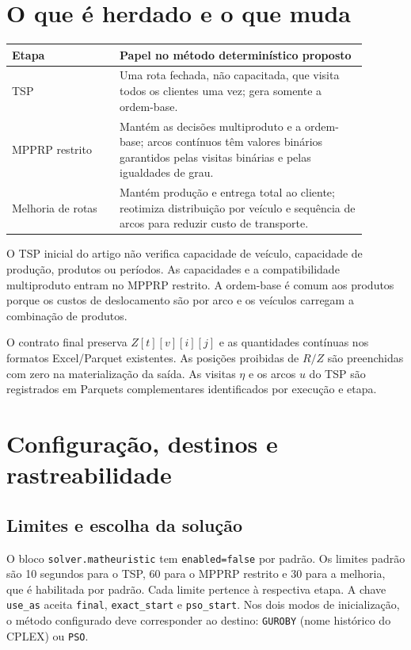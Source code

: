 \documentclass[11pt,a4paper]{article}
\begin{document}
\section{O que é herdado e o que muda}

\begin{center}
\begin{tabular}{p{0.27\linewidth}p{0.62\linewidth}}
\toprule
Etapa & Papel no método determinístico proposto \\
\midrule
TSP & Uma rota fechada, não capacitada, que visita todos os clientes uma vez; gera somente a ordem-base. \\
MPPRP restrito & Mantém as decisões multiproduto e a ordem-base; arcos contínuos têm valores binários garantidos pelas visitas binárias e pelas igualdades de grau. \\
Melhoria de rotas & Mantém produção e entrega total ao cliente; reotimiza distribuição por veículo e sequência de arcos para reduzir custo de transporte. \\
\bottomrule
\end{tabular}
\end{center}

O TSP inicial do artigo não verifica capacidade de veículo, capacidade de produção, produtos ou períodos. As capacidades e a compatibilidade multiproduto entram no MPPRP restrito. A ordem-base é comum aos produtos porque os custos de deslocamento são por arco e os veículos carregam a combinação de produtos.



O contrato final preserva $Z[t][v][i][j]$ e as quantidades contínuas nos formatos Excel/Parquet existentes. As posições proibidas de $R/Z$ são preenchidas com zero na materialização da saída. As visitas $\eta$ e os arcos $u$ do TSP são registrados em Parquets complementares identificados por execução e etapa.

\section{Configuração, destinos e rastreabilidade}

\subsection{Limites e escolha da solução}

O bloco \texttt{solver.matheuristic} tem \texttt{enabled=false} por padrão. Os limites padrão são 10 segundos para o TSP, 60 para o MPPRP restrito e 30 para a melhoria, que é habilitada por padrão. Cada limite pertence à respectiva etapa. A chave \texttt{use\_as} aceita \texttt{final}, \texttt{exact\_start} e \texttt{pso\_start}. Nos dois modos de inicialização, o método configurado deve corresponder ao destino: \texttt{GUROBY} (nome histórico do CPLEX) ou \texttt{PSO}.
\end{document}
